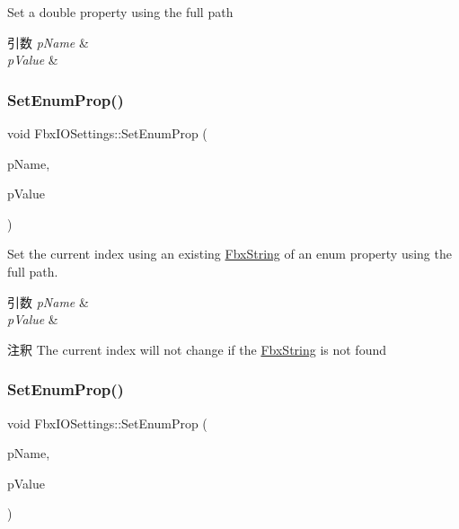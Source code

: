 Set a double property using the full path 
\begin{DoxyParams}{引数}
{\em p\+Name} & \\
\hline
{\em p\+Value} & \\
\hline
\end{DoxyParams}
\mbox{\label{class_fbx_i_o_settings_a26d37be8fcf5c4d74ee0dfb95b39923d}} 
\subsubsection{\texorpdfstring{Set\+Enum\+Prop()}{SetEnumProp()}\hspace{0.1cm}{\footnotesize\ttfamily [1/2]}}
{\footnotesize\ttfamily void Fbx\+I\+O\+Settings\+::\+Set\+Enum\+Prop (\begin{DoxyParamCaption}\item[{const char $\ast$}]{p\+Name,  }\item[{\hyperlink{class_fbx_string}{Fbx\+String}}]{p\+Value }\end{DoxyParamCaption})}

Set the current index using an existing \hyperlink{class_fbx_string}{Fbx\+String} of an enum property using the full path. 
\begin{DoxyParams}{引数}
{\em p\+Name} & \\
\hline
{\em p\+Value} & \\
\hline
\end{DoxyParams}
\begin{DoxyRemark}{注釈}
The current index will not change if the \hyperlink{class_fbx_string}{Fbx\+String} is not found 
\end{DoxyRemark}
\mbox{\label{class_fbx_i_o_settings_af1000ac57d0e7af9e55f9f629d50330f}} 
\subsubsection{\texorpdfstring{Set\+Enum\+Prop()}{SetEnumProp()}\hspace{0.1cm}{\footnotesize\ttfamily [2/2]}}
{\footnotesize\ttfamily void Fbx\+I\+O\+Settings\+::\+Set\+Enum\+Prop (\begin{DoxyParamCaption}\item[{const char $\ast$}]{p\+Name,  }\item[{int}]{p\+Value }\end{DoxyParamCaption})}


